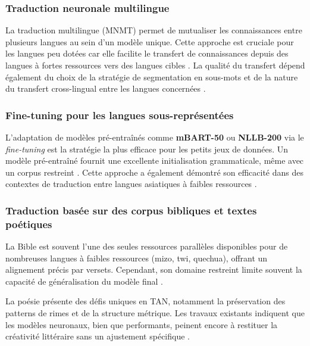 \subsubsection{Traduction neuronale multilingue}

La traduction multilingue (\ac{MNMT}) permet de mutualiser les connaissances entre plusieurs langues au sein d'un modèle unique. Cette approche est cruciale pour les langues peu dotées car elle facilite le transfert de connaissances depuis des langues à fortes ressources vers des langues cibles \cite{ali2026hybrid, baladaspanda2023improving}. La qualité du transfert dépend également du choix de la stratégie de segmentation en sous-mots et de la nature du transfert cross-lingual entre les langues concernées \cite{meyer2024systematic, toraman2022impact}.

\subsubsection{Fine-tuning pour les langues sous-représentées}

L'adaptation de modèles pré-entraînés comme \textbf{mBART-50} ou \textbf{NLLB-200} via le \textit{fine-tuning} est la stratégie la plus efficace pour les petits jeux de données. Un modèle pré-entraîné fournit une excellente initialisation grammaticale, même avec un corpus restreint \cite{rakhimov2024enhancing, hong2024cantonmt}. Cette approche a également démontré son efficacité dans des contextes de traduction entre langues asiatiques à faibles ressources \cite{tran2024improving}.

\subsubsection{Traduction basée sur des corpus bibliques et textes poétiques}

La Bible est souvent l'une des seules ressources parallèles disponibles pour de nombreuses langues à faibles ressources (mizo, twi, quechua), offrant un alignement précis par versets. Cependant, son domaine restreint limite souvent la capacité de généralisation du modèle final \cite{chanambam2022, angel2023comparing}.

La poésie présente des défis uniques en \ac{TAN}, notamment la préservation des patterns de rimes et de la structure métrique. Les travaux existants indiquent que les modèles neuronaux, bien que performants, peinent encore à restituer la créativité littéraire sans un ajustement spécifique \cite{dundjer2020automatic, liebeskind2024machine}.

